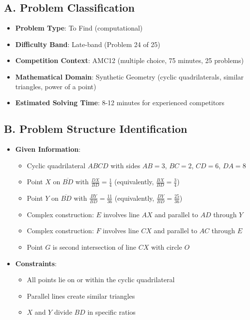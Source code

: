 \documentclass[]{article}
\begin{document}
\begin{problemconfigbox}
\subsection*{A. Problem Classification}
\begin{itemize}[leftmargin=*]
    \item \textbf{Problem Type}: To Find (computational)
    \item \textbf{Difficulty Band}: Late-band (Problem 24 of 25)
    \item \textbf{Competition Context}: AMC12 (multiple choice, 75 minutes, 25 problems)
    \item \textbf{Mathematical Domain}: Synthetic Geometry (cyclic quadrilaterals, similar triangles, power of a point)
    \item \textbf{Estimated Solving Time}: 8-12 minutes for experienced competitors
\end{itemize}

\subsection*{B. Problem Structure Identification}
\begin{itemize}[leftmargin=*]
    \item \textbf{Given Information}:
    \begin{itemize}
        \item Cyclic quadrilateral $ABCD$ with sides $AB=3$, $BC=2$, $CD=6$, $DA=8$
        \item Point $X$ on $\overline{BD}$ with $\frac{DX}{BD} = \frac{1}{4}$ (equivalently, $\frac{BX}{BD} = \frac{3}{4}$)
        \item Point $Y$ on $\overline{BD}$ with $\frac{BY}{BD} = \frac{11}{36}$ (equivalently, $\frac{DY}{BD} = \frac{25}{36}$)
        \item Complex construction: $E$ involves line $AX$ and parallel to $AD$ through $Y$
        \item Complex construction: $F$ involves line $CX$ and parallel to $AC$ through $E$
        \item Point $G$ is second intersection of line $CX$ with circle $O$
    \end{itemize}
    
    \item \textbf{Constraints}:
    \begin{itemize}
        \item All points lie on or within the cyclic quadrilateral
        \item Parallel lines create similar triangles
        \item $X$ and $Y$ divide $BD$ in specific ratios
    \end{itemize}
    

\end{itemize}
\end{problemconfigbox}
\end{document}
